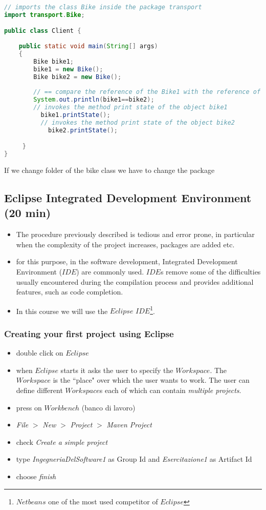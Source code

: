 \documentclass{article}
\theoremstyle{definition}
\begin{document}
\begin{lstlisting}[language=Java,escapechar=|]
// imports the class Bike inside the package transport
import transport.Bike;

public class Client {
	
	public static void main(String[] args)
    {
        Bike bike1; 
        bike1 = new Bike();
        Bike bike2 = new Bike(); 
        
        // == compare the reference of the Bike1 with the reference of the Bike2
        System.out.println(bike1==bike2);
        // invokes the method print state of the object bike1       
          bike1.printState();
          // invokes the method print state of the object bike2
            bike2.printState();

     }
}
\end{lstlisting}

If we change folder of the bike class we have to change the package

\subsection{Eclipse Integrated Development Environment  (20 min)}
\begin{itemize}
\item The procedure previously described is tedious and error prone, in particular when the complexity of the project increases, packages are added etc.
\item for this purpose, in the software development,  Integrated Development Environment ($IDE$) are commonly used. $IDE$s remove some of the difficulties usually encountered during the compilation process and provides additional features, such as code completion.
\item In this course we will use the $Eclipse$ $IDE$\footnote{$Netbeans$ one of the most used competitor of $Eclipse$}.  
\end{itemize}

\subsubsection{Creating your first project using Eclipse}
\begin{itemize}
\item double click on $Eclipse$
\item when $Eclipse$ starts it asks the user to specify the $Workspace$. The $Workspace$ is the ``place" over which the user wants to work. The user can define different $Workspace$s each of which can contain \emph{multiple projects}.
\item press on $Workbench$ (banco di lavoro)
\item \textit{File} $>$ \textit{New} $>$ \textit{Project} $>$ \textit{Maven Project}
\item check \textit{Create a simple project}
\item type \textit{IngegneriaDelSoftware1} as Group Id and \textit{Esercitazione1} as Artifact Id
\item choose \textit{finish}
\end{itemize}
\end{document}
